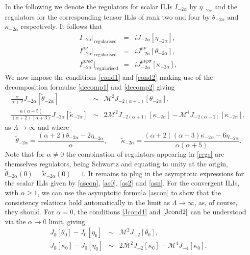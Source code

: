 \documentclass[12pt, letter]{article}
\def\be{\begin{equation}}
\def\ee{\end{equation}}
\newcommand{\M}{\mathcal{M}}
\begin{document}
In the following we denote the regulators for scalar ILIs $I_{-2\alpha}$ by  $\eta_{-2\alpha}$ and the regulators for the corresponding tensor ILIs of rank two and four by  $\theta_{-2\alpha}$ and $\kappa_{-2\alpha}$ respectively. It follows that 
\begin{eqnarray}
 I_{-2\alpha}|_\text{regularised} &=& i J_{-2\alpha}[\eta_{-2\alpha} ], \label{Jeta} \\
I^{\mu\nu}_{-2\alpha}|_\text{regularised} &=&  i J^{\mu\nu}_{-2\alpha} [\theta_{-2\alpha} ], \label{Jtheta} \\
I^{\mu\nu\rho \sigma}_{-2\alpha}|_\text{regularised} &=& iJ^{\mu\nu\rho \sigma}_{-2\alpha}[\kappa_{-2\alpha} ], \label{Jkappa}
\end{eqnarray}
We now impose the conditions \eqref{cond1} and \eqref{cond2} making use of the decomposition formulae \eqref{decomp1} and \eqref{decomp2} giving
\begin{eqnarray}
\frac{\alpha}{\alpha+2} J_{-2\alpha} \left[ \tilde \theta_{-2\alpha}\right]&\sim & \M^2 J_{-2(\alpha+1)}[\theta_{-2\alpha}] \label{Jcond1}, \\
\frac{\alpha(\alpha+5)}{(\alpha+2)(\alpha+3)} J_{-2\alpha} \left[ \tilde \kappa_{-2\alpha}\right]& \sim & 2\M^2 J_{-2(\alpha+1)}[\kappa_{-2\alpha}]-\M^4 J_{-2(\alpha+2)}[\kappa_{-2\alpha}],  \label{Jcond2}
\end{eqnarray}
as $\Lambda \to \infty$  and where 
\be
\tilde \theta_{-2\alpha}=\frac{(\alpha+2)\theta_{-2\alpha}-2 \eta_{-2\alpha}}{\alpha}, \qquad \tilde \kappa_{-2\alpha}=\frac{(\alpha+2)(\alpha+3)\kappa_{-2\alpha}-6 \eta_{-2\alpha}}{\alpha(\alpha+5)}. \label{regs}
\ee
Note that for $\alpha\neq 0$ the combination of regulators appearing in \eqref{regs}  are themselves regulators,  being Schwartz and equating to unity at the origin, $\tilde \theta_{-2\alpha}(0)=\tilde \kappa_{-2\alpha}(0)=1$. It remains to plug in the  asymptotic expressions for the scalar ILIs given by \eqref{ascon}, \eqref{as0}, \eqref{as2} and \eqref{asn}. For the convergent ILIs, with $\alpha \geq 1$,  we can use the asymptotic formula \eqref{ascon} to show that the consistency relations hold automatically in the limit as $\Lambda \to \infty$, as, of course, they should.  For $\alpha=0$,  the conditions \eqref{Jcond1} and $\eqref{Jcond2}$ can be understood via the $\alpha \to 0$ limit, giving
\begin{eqnarray}
J_{0} [ \theta_{0}]- J_{0} [ \eta_{0} ]&\sim & \M^2 J_{-2}[\theta_{0}], \label{Jcond1_}\\
J_{0} [ \kappa_{0}]- J_{0} [ \eta_{0} ] & \sim & 2\M^2 J_{-2}[\kappa_{0}]-\M^4 J_{-4}[\kappa_{0}].  \label{Jcond2_}
\end{eqnarray}
\end{document}
